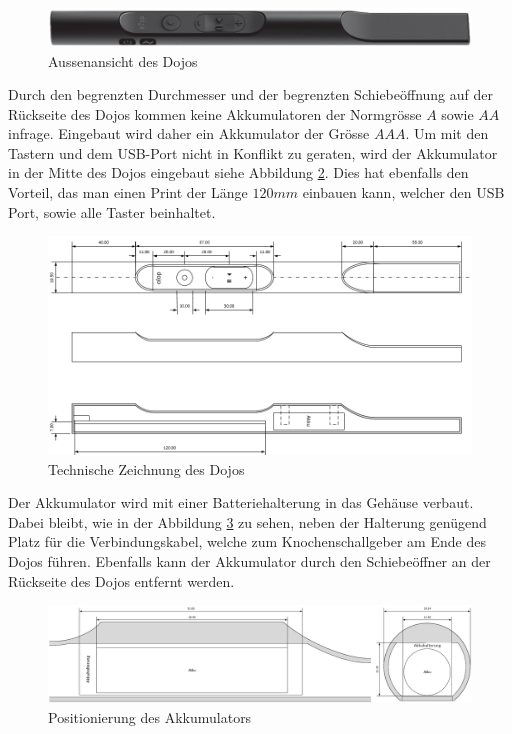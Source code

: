 \begin{figure}[h]
	\centering
	\includegraphics[width=\textwidth]{graphics/DojoBild.png}
	\caption{Aussenansicht des Dojos}
	\label{fig:DojoBild}
\end{figure}

Durch den begrenzten Durchmesser und der begrenzten Schiebeöffnung auf der Rückseite des Dojos kommen keine Akkumulatoren der Normgrösse $A$ sowie $AA$ infrage. Eingebaut wird daher ein Akkumulator der Grösse $AAA$. Um mit den Tastern und dem USB-Port nicht in Konflikt zu geraten, wird der Akkumulator in der Mitte des Dojos eingebaut siehe Abbildung \ref{fig:DojoQuerschnitt}. Dies hat ebenfalls den Vorteil, das man einen Print der Länge $120mm$ einbauen kann, welcher den USB Port, sowie alle Taster beinhaltet.

\begin{figure}[h]
	\centering
	\includegraphics[width=\textwidth]{graphics/DojoQuerschnitt.png}
	\caption{Technische Zeichnung des Dojos}
	\label{fig:DojoQuerschnitt}
\end{figure}

\newpage

Der Akkumulator wird mit einer Batteriehalterung in das Gehäuse verbaut. Dabei bleibt, wie in der Abbildung \ref{fig:DojoAkkumulatorQuerschnitt} zu sehen, neben der Halterung genügend Platz für die Verbindungskabel, welche zum Knochenschallgeber am Ende des Dojos führen. Ebenfalls kann der Akkumulator durch den Schiebeöffner an der Rückseite des Dojos entfernt werden.

\begin{figure}[h]
	\centering
	\includegraphics[width=\textwidth]{graphics/DojoAkkumulatorQuerschnitt.png}
	\caption{Positionierung des Akkumulators}
	\label{fig:DojoAkkumulatorQuerschnitt}
\end{figure}

